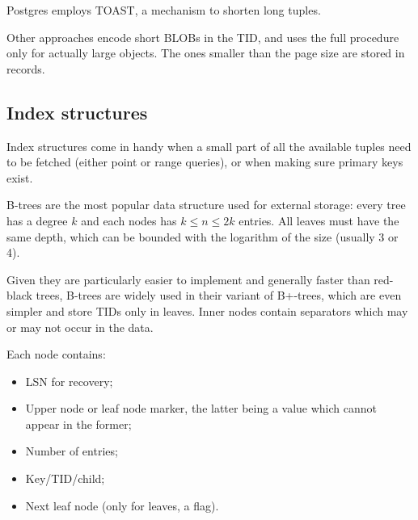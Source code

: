 Postgres employs TOAST, a mechanism to shorten long tuples.

Other approaches encode short BLOBs in the TID, and uses the full procedure only for actually large objects. The ones smaller than the page size are stored in records.

\subsection{Index structures}
Index structures come in handy when a small part of all the available tuples need to be fetched (either point or range queries), or when making sure primary keys exist. 

B-trees are the most popular data structure used for external storage: every tree has a degree $k$ and each nodes has $k \leq n \leq 2k$ entries. All leaves must have the same depth, which can be bounded with the logarithm of the size (usually 3 or 4).

Given they are particularly easier to implement and generally faster than red-black trees, B-trees are widely used in their variant of B+-trees, which are even simpler and store TIDs only in leaves. Inner nodes contain separators which may or may not occur in the data.

Each node contains:
\begin{itemize}
	\item LSN for recovery;
	\item Upper node or leaf node marker, the latter being a value which cannot appear in the former;
	\item Number of entries;
	\item Key/TID/child;
	\item Next leaf node (only for leaves, a flag).
\end{itemize}


